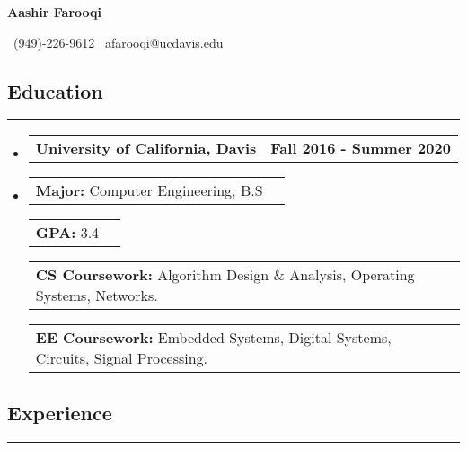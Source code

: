 \documentclass[10pt,letterpaper]{article}
\makeatletter
\newcommand{\items}[2]
{
	\begin{tabular*}{\linewidth}{l @{\extracolsep{\fill}} r}
		#1 & #2 \\
	\end{tabular*}
}
\newcommand{\header}[2]
{
	\begin{tabular*}{\linewidth}{l @{\extracolsep{\fill}} r}
		\hspace{-27pt} #1 & #2 \\
	\end{tabular*}
}
\newcommand{\sectionbreak}
{
	\vspace{-1.2em}
	\rule{\textwidth}{1.7pt}
	\vspace{-1.7em}
}
\makeatother
\begin{document}
\begin{center}
{\LARGE \textbf{Aashir Farooqi}}

\vspace{0.5em}
\ (949)-226-9612 \textbar 
\ afarooqi@ucdavis.edu\textbar
\ \href{https://github.com/AashPointO}{\emph{\underline{}}}
\\
\end{center}
\vspace{-20pt}


\subsection*{Education}
\sectionbreak

\begin{itemize}

\item[] 
	\header
		{\textbf{University of California, Davis}}
		{\textbf{Fall 2016 - Summer 2020}}
\item[]
	\vspace{-2.5pt}
	\items
		{\textbf{Major:} Computer Engineering, B.S}
		{}
	\items
		{\textbf{GPA:} 3.4}
		{}
	\items
		{\textbf{CS Coursework:} Algorithm Design \& Analysis, Operating Systems, Networks.}
		{}
	\items
		{\textbf{EE Coursework:} Embedded Systems, Digital Systems, Circuits, Signal Processing.}
		{}
{\vspace{-0.6em}}
	
\end{itemize}

\vspace{-24.65pt}

\subsection*{Experience}
\sectionbreak
\end{document}

